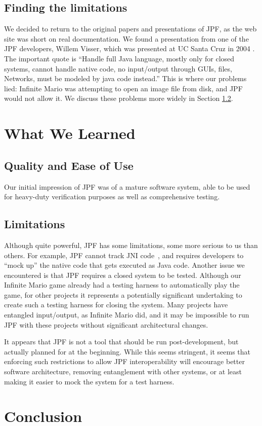 \documentclass[twocolumn]{article}
\begin{document}
\subsection{Finding the limitations}
We decided to return to the original papers and presentations of JPF, as the web site was short on real documentation. We found a presentation from one of the JPF developers, Willem Visser, which was presented at UC Santa Cruz in 2004 \cite{visser:presentation}. The important quote is ``Handle full Java language, mostly only for closed systems, cannot handle native code, no input/output through GUIs, files, Networks, must be modeled by java code instead.'' This is where our problems lied: Infinite Mario was attempting to open an image file from disk, and JPF would not allow it. We discuss these problems more widely in Section \ref{section:limitations}.

\section{What We Learned}

\subsection{Quality and Ease of Use}
Our initial impression of JPF was of a mature software system, able to be used for heavy-duty verification purposes as well as comprehensive testing. 


\subsection{Limitations}
\label{section:limitations}
Although quite powerful, JPF has some limitations, some more serious to us than others. 
For example, JPF cannot track JNI code~\cite{jni}, and requires developers to ``mock up'' the native code that gets executed as Java code. 
Another issue we encountered is that JPF requires a closed system to be tested. 
Although our Infinite Mario game already had a testing harness to automatically play the game, for other projects it represents a potentially significant undertaking to create such a testing harness for closing the system. Many projects have entangled input/output, as Infinite Mario did, and it may be impossible to run JPF with these projects without significant architectural changes.

It appears that JPF is not a tool that should be run post-development, but actually planned for at the beginning. While this seems stringent, it seems that enforcing such restrictions to allow JPF interoperability will encourage better software architecture, removing entanglement with other systems, or at least making it easier to mock the system for a test harness.

\section{Conclusion}





\end{document}
